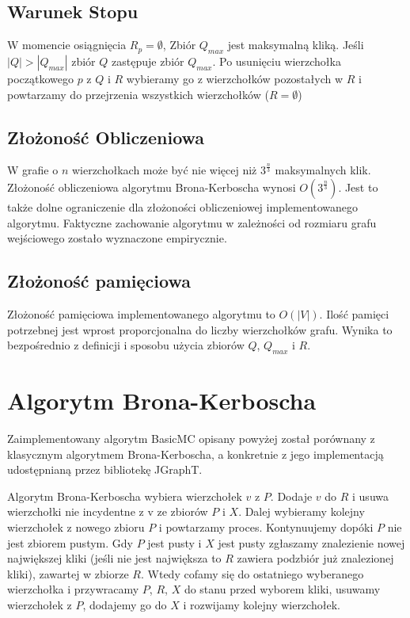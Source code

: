 \documentclass[12pt, a4paper]{article}
\begin{document}
\subsection{Warunek Stopu}

W momencie osiągnięcia $R_{p} = \emptyset$, Zbiór $Q_{max}$ jest maksymalną kliką. Jeśli $|Q| > |Q_{max}|$ zbiór $Q$ zastępuje zbiór $Q_{max}$. Po usunięciu wierzchołka początkowego $p$ z $Q$ i $R$ wybieramy go z wierzchołków pozostałych w $R$ i powtarzamy do przejrzenia wszystkich wierzchołków ($R = \emptyset$)

\subsection{Złożoność Obliczeniowa}
W grafie o $n$ wierzchołkach może być nie więcej niż $3^{\frac{n}{3}}$ maksymalnych klik. Złożoność obliczeniowa algorytmu Brona-Kerboscha wynosi $O(3^{\frac{n}{3}})$.
Jest to także dolne ograniczenie dla złożoności obliczeniowej implementowanego algorytmu. Faktyczne zachowanie algorytmu w zależności od rozmiaru grafu wejściowego zostało wyznaczone empirycznie.

\subsection{Złożoność pamięciowa}
\label{memory_complexity}

Złożoność pamięciowa implementowanego algorytmu to $O(|V|)$. Ilość pamięci potrzebnej jest wprost proporcjonalna do liczby wierzchołków grafu. Wynika to bezpośrednio z definicji i sposobu użycia zbiorów $Q$, $Q_{max}$ i $R$.

\section{Algorytm Brona-Kerboscha}

Zaimplementowany algorytm BasicMC opisany powyżej został porównany z klasycznym algorytmem Brona-Kerboscha, a konkretnie z jego implementacją udostępnianą przez bibliotekę JGraphT.

Algorytm Brona-Kerboscha wybiera wierzchołek $v$ z $P$. Dodaje $v$ do $R$ i usuwa wierzchołki nie incydentne z v ze zbiorów $P$ i $X$. Dalej wybieramy kolejny wierzchołek z nowego zbioru $P$ i powtarzamy proces. Kontynuujemy dopóki $P$ nie jest zbiorem pustym. Gdy $P$ jest pusty i $X$ jest pusty zgłaszamy znalezienie nowej największej kliki (jeśli nie jest największa to $R$ zawiera podzbiór już znalezionej kliki), zawartej w zbiorze $R$. Wtedy cofamy się do ostatniego wyberanego wierzchołka i przywracamy $P$, $R$, $X$ do stanu przed wyborem kliki, usuwamy wierzchołek z $P$, dodajemy go do $X$ i rozwijamy kolejny wierzchołek.\citep{bron-kerbosch}
\end{document}
